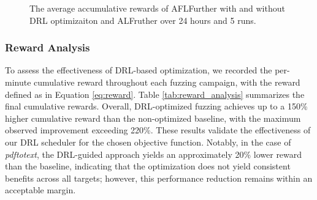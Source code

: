 \documentclass[lettersize,journal]{IEEEtran}
\begin{document}
\begin{figure}[t!]
	\caption{The average accumulative rewards of AFLFurther with and without DRL optimizaiton and ALFruther over 24 hours and 5 runs.}
	\label{fig:reward_plot}
\end{figure}

\subsubsection{Reward Analysis}\label{subsubsec:reward_analysis}

To assess the effectiveness of DRL-based optimization, we recorded the per-minute cumulative reward throughout each fuzzing campaign, with the reward defined as in Equation \ref{eq:reward}. Table \ref{tab:reward_analysis} summarizes the final cumulative rewards. Overall, DRL-optimized fuzzing achieves up to a 150\% higher cumulative reward than the non-optimized baseline, with the maximum observed improvement exceeding 220\%. These results validate the effectiveness of our DRL scheduler for the chosen objective function. Notably, in the case of \textit{pdftotext}, the DRL-guided approach yields an approximately 20\% lower reward than the baseline, indicating that the optimization does not yield consistent benefits across all targets; however, this performance reduction remains within an acceptable margin.
\end{document}
